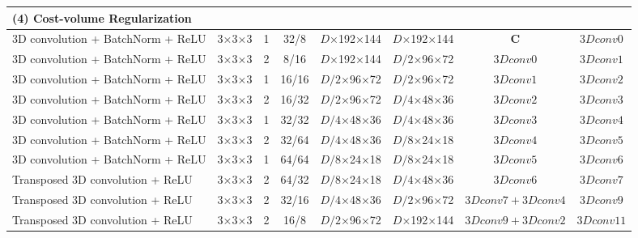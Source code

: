 \begin{table}[htbp]
\begin{adjustbox}{width=1\textwidth}
\begin{tabular}{|l|c|c|c|c|c|c|c|}
\hline
\rowcolor{bgcolor}
\textbf{(4) Cost-volume Regularization} &                 &                 &                 &                 &                 &                    &                 \\ \hline
3D convolution + BatchNorm + ReLU                            & 3×3×3             & 1               & 32/8         & $D$×192×144           & $D$×192×144           & $\textbf{C}$              & $3Dconv0$          \\ \hline
3D convolution + BatchNorm + ReLU                             & 3×3×3             & 2               & 8/16         & $D$×192×144           & $D/2$×96×72           & $3Dconv0$             & $3Dconv1$          \\ \hline
3D convolution + BatchNorm + ReLU                             & 3×3×3             & 1               & 16/16         & $D/2$×96×72           & $D/2$×96×72           & $3Dconv1$             & $3Dconv2$          \\ \hline
3D convolution + BatchNorm + ReLU                             & 3×3×3             & 2               & 16/32         & $D/2$×96×72           & $D/4$×48×36           & $3Dconv2$             & $3Dconv3$          \\ \hline
3D convolution + BatchNorm + ReLU                             & 3×3×3             & 1               & 32/32         & $D/4$×48×36           & $D/4$×48×36            & $3Dconv3$             & $3Dconv4$          \\ \hline
3D convolution + BatchNorm + ReLU                             & 3×3×3             & 2               & 32/64        & $D/4$×48×36            & $D/8$×24×18             & $3Dconv4$            & $3Dconv5$          \\ \hline
3D convolution + BatchNorm + ReLU                             & 3×3×3             & 1               & 64/64       & $D/8$×24×18             & $D/8$×24×18            & $3Dconv5$             & $3Dconv6$          \\ \hline
Transposed 3D convolution + ReLU                  & 3×3×3             & 2               & 64/32          & $D/8$×24×18            & $D/4$×48×36            & $3Dconv6$             & $3Dconv7$          \\ \hline
Transposed 3D convolution + ReLU                 & 3×3×3             & 2               & 32/16        & $D/4$×48×36            & $D/2$×96×72           & $3Dconv7+3Dconv4$             & $3Dconv9$         \\ \hline
Transposed 3D convolution + ReLU                 & 3×3×3             & 2               & 16/8        & $D/2$×96×72           & $D$×192×144           & $3Dconv9+3Dconv2$ & $3Dconv11$          \\ \hline

\end{tabular}
\end{adjustbox}
\end{table}
